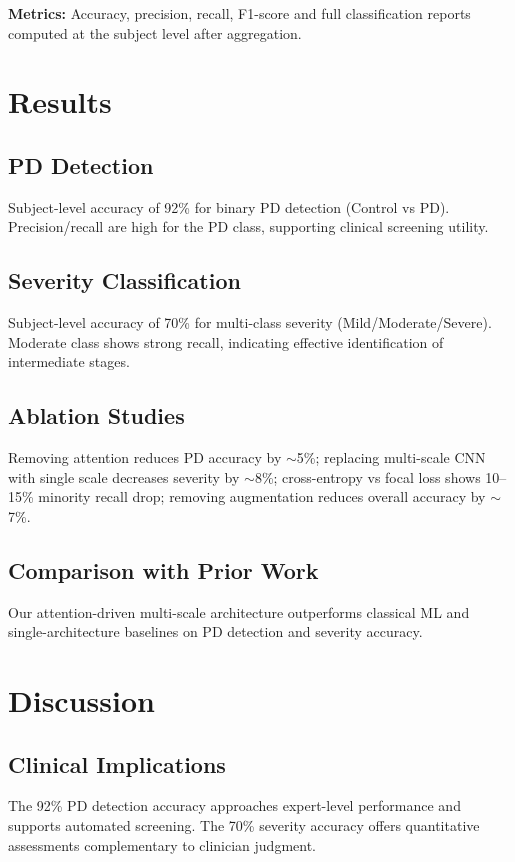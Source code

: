 \documentclass[conference]{IEEEtran}
\begin{document}
\textbf{Metrics:} Accuracy, precision, recall, F1-score and full classification reports computed at the subject level after aggregation.

\section{Results}
\subsection{PD Detection}
Subject-level accuracy of 92\% for binary PD detection (Control vs PD). Precision/recall are high for the PD class, supporting clinical screening utility.

\subsection{Severity Classification}
Subject-level accuracy of 70\% for multi-class severity (Mild/Moderate/Severe). Moderate class shows strong recall, indicating effective identification of intermediate stages.

\subsection{Ablation Studies}
Removing attention reduces PD accuracy by $\sim$5\%; replacing multi-scale CNN with single scale decreases severity by $\sim$8\%; cross-entropy vs focal loss shows 10--15\% minority recall drop; removing augmentation reduces overall accuracy by $\sim$7\%.

\subsection{Comparison with Prior Work}
Our attention-driven multi-scale architecture outperforms classical ML and single-architecture baselines on PD detection and severity accuracy.

\section{Discussion}
\subsection{Clinical Implications}
The 92\% PD detection accuracy approaches expert-level performance and supports automated screening. The 70\% severity accuracy offers quantitative assessments complementary to clinician judgment.
\end{document}
